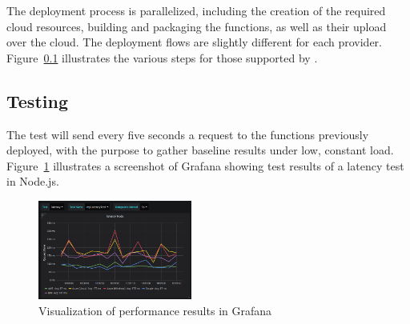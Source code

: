 The deployment process is parallelized, including the creation of the required cloud resources, building and packaging the functions, as well as their upload over the cloud.
The deployment flows are slightly different for each provider. 
Figure~\ref{} illustrates the various steps for those supported by \sys.
 

\subsection{Testing}
The test will send every five seconds a request to the functions previously deployed, with the purpose to gather baseline results under low, constant load. %
Figure~\ref{fig:grafana} illustrates a screenshot of Grafana showing test results of a latency test in Node.js. 

\begin{figure}[!t]
\begin{center}
\includegraphics[width=0.45\textwidth]{bilder/grafana.png}
\caption{Visualization of performance results in Grafana}
\label{fig:grafana}
\end{center}
\end{figure}

